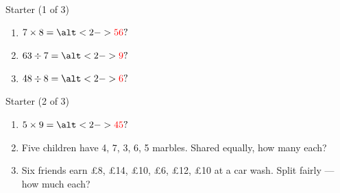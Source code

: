 \documentclass{beamer}
\newcommand{\ashow}[1]{\uncover<2->{\textcolor{red}{\small #1}}}
\newcommand{\ashowq}[1]{\alt<2->{\textcolor{red}{\small #1}}{?}}
\begin{document}
\begin{frame}{Starter (1 of 3)}
\footnotesize
\begin{enumerate}\itemsep1pt
  \item $7 \times 8 = \ashowq{56}$
  \item $63 \div 7 = \ashowq{9}$
  \item $48 \div 8 = \ashowq{6}$
\end{enumerate}
\end{frame}

\begin{frame}{Starter (2 of 3)}
\footnotesize
\begin{enumerate}\itemsep1pt
  \setcounter{enumi}{3}
  \item $5 \times 9 = \ashowq{45}$
  \item Five children have 4, 7, 3, 6, 5 marbles. Shared equally, how many each? \ashow{5 marbles}
  \item Six friends earn £8, £14, £10, £6, £12, £10 at a car wash. Split fairly — how much each? \ashow{\pounds10 each}
\end{enumerate}
\end{frame}
\end{document}
